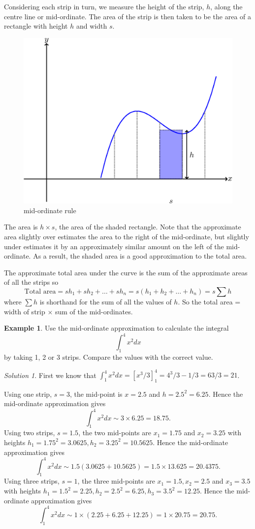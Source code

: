 \documentclass[
  11pt,
  oneside]{book}
\newcommand{\slide}{}
\theoremstyle{definition}
\theoremstyle{definition}
\newtheorem{example}{Example}[chapter]
\theoremstyle{definition}
\theoremstyle{definition}
\theoremstyle{remark}
\newtheorem*{solution}{Solution}
\begin{document}
Considering each strip in turn, we measure the height of the strip, \(h\), along the centre line or mid-ordinate. The area of the strip is then taken to be the area of a rectangle with height \(h\) and width \(s\).
\slide

\begin{figure}

\includegraphics[width=0.4\linewidth]{tikztopng-figure27} \hfill{}

\caption{mid-ordinate rule}\label{fig:unnamed-chunk-52}
\end{figure}

The area is \(h \times s\), the area of the shaded rectangle. Note that the approximate area slightly over estimates the area to the right of the mid-ordinate, but slightly under estimates it by an approximately similar amount on the left of the mid-ordinate. As a result, the shaded area is a good approximation to the total area.

The approximate total area under the curve is the sum of the approximate areas of all the strips so
\[
\text{Total area} = sh_1 + sh_2 + \ldots + sh_n = s(h_1 + h_2 + \ldots + h_n) = s\sum h
\]
where \(\sum h\) is shorthand for the sum of all the values of \(h\). So the total area = width of strip \(\times\) sum of the mid-ordinates.

\slide

\begin{example}
Use the mid-ordinate approximation to calculate the integral
\[
\int_1^4x^2dx
\]
by taking 1, 2 or 3 strips. Compare the values with the correct value.
\end{example}

\begin{solution}
First we know that \(\displaystyle\int_1^4 x^2 dx = [x^3/3]_1^4 = 4^3/3-1/3 = 63/3 = 21\).

Using one strip, \(s=3\), the mid-point is \(x=2.5\) and \(h=2.5^2 = 6.25\). Hence the mid-ordinate approximation gives
\[
\int_1^4 x^2 dx \sim 3\times 6.25 = 18.75.
\]
Using two strips, \(s=1.5\), the two mid-points are \(x_1=1.75\) and \(x_2=3.25\) with heights \(h_1=1.75^2=3.0625, h_2=3.25^2=10.5625\). Hence the mid-ordinate approximation gives
\[
\int_1^4 x^2 dx \sim 1.5(3.0625+10.5625)=1.5\times13.625 = 20.4375.
\]
Using three strips, \(s=1\), the three mid-points are \(x_1=1.5, x_2=2.5\) and \(x_3=3.5\) with heights \(h_1=1.5^2=2.25, h_2=2.5^2=6.25, h_3=3.5^2=12.25\). Hence the mid-ordinate approximation gives
\[
\int_1^4 x^2 dx \sim 1\times(2.25+6.25+12.25)=1\times20.75 = 20.75.
\]
\end{solution}
\end{document}

